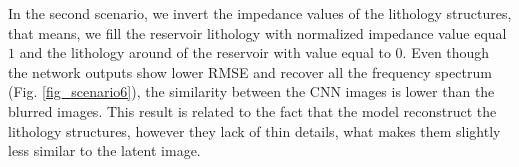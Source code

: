 \documentclass[conference,compsoc]{IEEEtran}
\begin{document}
In the second scenario, we invert the impedance values of the lithology structures, that means,
we fill the reservoir lithology with normalized impedance value equal $1$ and the lithology
around of the reservoir with value equal to $0$.
Even though the network outputs show lower RMSE and recover all the frequency spectrum (Fig. \ref{fig_scenario6}), the similarity
between the CNN images is lower than the blurred images.
This result is related to the fact that the model reconstruct the lithology structures, however they lack of thin
details, what makes them slightly less similar to the latent image.
\end{document}
